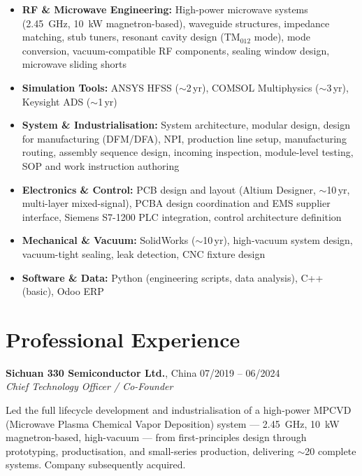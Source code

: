\documentclass[a4paper,11pt]{article}
\begin{document}
\begin{itemize}[noitemsep, topsep=2pt, leftmargin=*]
    \item \textbf{RF \& Microwave Engineering:}
          High-power microwave systems (2.45~GHz, 10~kW magnetron-based),
          waveguide structures, impedance matching, stub tuners, resonant cavity
          design (TM$_{012}$ mode), mode conversion, vacuum-compatible RF components,
          sealing window design, microwave sliding shorts

    \item \textbf{Simulation Tools:}
          ANSYS HFSS ($\sim$2\,yr), COMSOL Multiphysics ($\sim$3\,yr),
          Keysight ADS ($\sim$1\,yr)

    \item \textbf{System \& Industrialisation:}
          System architecture, modular design, design for manufacturing (DFM/DFA),
          NPI, production line setup, manufacturing routing, assembly sequence design,
          incoming inspection, module-level testing, SOP and work instruction authoring

    \item \textbf{Electronics \& Control:}
          PCB design and layout (Altium Designer, $\sim$10\,yr, multi-layer mixed-signal),
          PCBA design coordination and EMS supplier interface,
          Siemens S7-1200 PLC integration, control architecture definition

    \item \textbf{Mechanical \& Vacuum:}
          SolidWorks ($\sim$10\,yr), high-vacuum system design,
          vacuum-tight sealing, leak detection, CNC fixture design

    \item \textbf{Software \& Data:}
          Python (engineering scripts, data analysis), C++ (basic), Odoo ERP
\end{itemize}

\section*{Professional Experience}

\noindent\textbf{Sichuan 330 Semiconductor Ltd.}, China
\hfill 07/2019 -- 06/2024 \\
\textit{Chief Technology Officer / Co-Founder}

\noindent Led the full lifecycle development and industrialisation of a high-power
MPCVD (Microwave Plasma Chemical Vapor Deposition) system --- 2.45~GHz, 10~kW
magnetron-based, high-vacuum --- from first-principles design through prototyping,
productisation, and small-series production, delivering $\sim$20 complete systems.
Company subsequently acquired.
\end{document}
